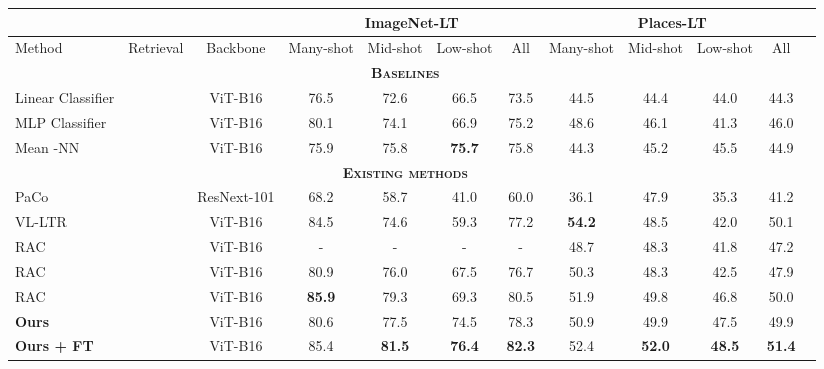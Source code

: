 \begin{table*}
\small
\setlength{\tabcolsep}{4pt}
\begin{center}
\begin{tabular}{lccccccccccc}
\toprule
					& 				&				& \multicolumn{4}{c}{ImageNet-LT} & \multicolumn{4}{c}{Places-LT} \\
\midrule 
Method 				&	Retrieval	& Backbone	& Many-shot 	& Mid-shot 		& Low-shot 	& All 	& Many-shot 	& Mid-shot 		& Low-shot 	& All				\\
\midrule
									 \multicolumn{11}{c}{\textsc{\textbf{Baselines}}}																																														\\
\midrule
Linear Classifier 	& 				& ViT-B16 \faLock		& 76.5 			& 72.6 					& 66.5 						& 73.5  				& 44.5							& 44.4 					& 44.0 						& 44.3  			\\
MLP Classifier 		&				& ViT-B16 \faLock		& 80.1 			& 74.1 					& 66.9 						& 75.2  				& 48.6							& 46.1 					& 41.3 						& 46.0  			\\
Mean -NN  		& \checkmark	& ViT-B16 \faLock		& 75.9 			& 75.8 					& \textbf{75.7} 			& 75.8  				& 44.3							& 45.2 					& 45.5 						& 44.9  			\\
\midrule
									 \multicolumn{11}{c}{\textsc{\textbf{Existing methods}}}																																							\\
\midrule
PaCo~\cite{cui2021parametric} 		  & 				& ResNext-101	& 68.2 			& 58.7 			& 41.0 		& 60.0  	& 36.1			& 47.9 			& 35.3 		& 41.2  			\\

VL-LTR~\cite{tian2022vl}		  &					& ViT-B16				& 84.5 			& 74.6 			& 59.3 		& 77.2  		& \textbf{54.2}		& 48.5 			& 42.0 		& 50.1  			\\
RAC~\cite{long2022retrieval}  		  & \checkmark	& ViT-B16				& - 			& - 			& - 		& -  			& 48.7				& 48.3 			& 41.8 		& 47.2  			\\
RAC~\cite{long2022retrieval} & \checkmark	& ViT-B16 \faLock		& 80.9 			& 76.0 			& 67.5 		& 76.7  		& 50.3				& 48.3 			& 42.5 		& 47.9  				\\
RAC~\cite{long2022retrieval} & \checkmark	& ViT-B16 				& \textbf{85.9} & 79.3 			& 69.3 		& 80.5  		& 51.9				& 49.8 			& 46.8 		& 50.0  				\\
\midrule
\textbf{Ours} 		  		& \checkmark		& ViT-B16 \faLock		& 80.6  		& 77.5 			& 74.5 			& 78.3 			& 50.9	& 49.9 				& 47.5				& 49.9  	\\
\textbf{Ours + FT} 		  	& \checkmark		& ViT-B16				& 85.4	& \textbf{81.5} & \textbf{76.4} & \textbf{82.3} & 52.4	& \textbf{52.0} 	& \textbf{48.5} 	& \textbf{51.4}  	\\
\bottomrule
\end{tabular}
\end{center}



\end{table*}
